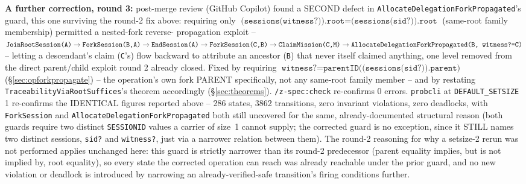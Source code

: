 \documentclass[a4paper,10pt,fleqn]{article}
\newcommand{\field}[1]{\texttt{#1}}
\begin{document}
\textbf{A further correction, round 3:} post-merge review (GitHub
Copilot) found a SECOND defect in
\field{AllocateDelegationForkPropagated}'s guard, this one surviving
the round-2 fix above: requiring only
$\field{(sessions(witness?)).root} = \field{(sessions(sid?)).root}$
(same-root family membership) permitted a nested-fork reverse-
propagation exploit --
$\field{JoinRootSession(A)} \to \field{ForkSession(B,A)} \to
\field{EndSession(A)} \to \field{ForkSession(C,B)} \to
\field{ClaimMission(C,M)} \to
\field{AllocateDelegationForkPropagated(B, \field{witness?}=C)}$ --
letting a descendant's claim (\field{C}'s) flow backward to attribute
an ancestor (\field{B}) that never itself claimed anything, one level
removed from the direct parent/child exploit round 2 already closed.
Fixed by requiring $\field{witness?} = \field{parentID((sessions(sid?)).parent)}$
(\S\ref{sec:opforkpropagate}) -- the operation's own fork PARENT
specifically, not any same-root family member -- and by restating
\field{TraceabilityViaRootSuffices}'s theorem accordingly
(\S\ref{sec:theorems}). \texttt{/z-spec:check} re-confirms 0 errors.
\texttt{probcli} at \field{DEFAULT\_SETSIZE} 1 re-confirms the IDENTICAL
figures reported above -- 286 states, 3862 transitions, zero invariant
violations, zero deadlocks, with \field{ForkSession} and
\field{AllocateDelegationForkPropagated} both still uncovered for the
same, already-documented structural reason (both guards require two
distinct \field{SESSIONID} values a carrier of size~1 cannot supply;
the corrected guard is no exception, since it STILL names two distinct
sessions, \field{sid?} and \field{witness?}, just via a narrower
relation between them). The round-2 reasoning for why a setsize-2
rerun was not performed applies unchanged here: this guard is strictly
narrower than its round-2 predecessor (parent equality implies, but is
not implied by, root equality), so every state the corrected operation
can reach was already reachable under the prior guard, and no new
violation or deadlock is introduced by narrowing an already-verified-safe
transition's firing conditions further.
\end{document}
